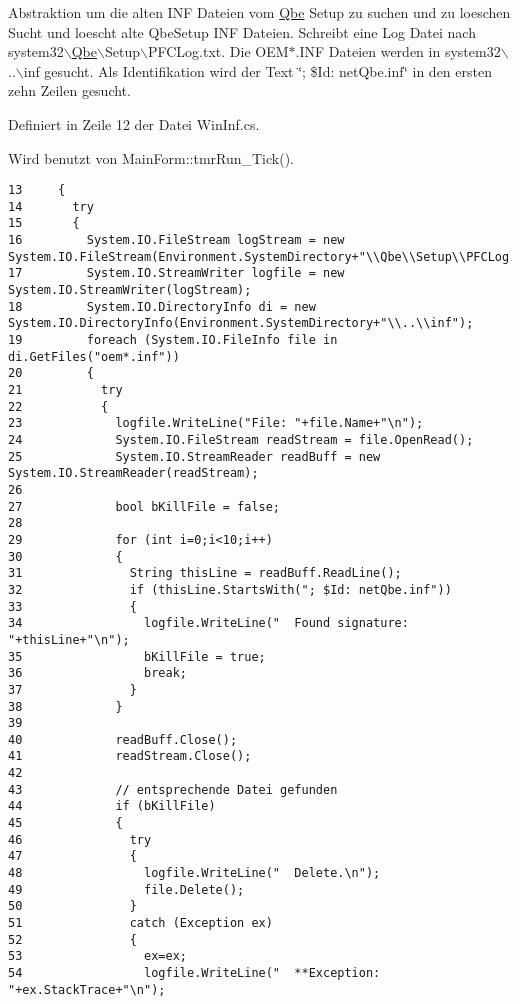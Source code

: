 Abstraktion um die alten INF Dateien vom \hyperlink{namespaceQbe}{Qbe} Setup zu suchen und zu loeschen Sucht und loescht alte Qbe\-Setup INF Dateien. Schreibt eine Log Datei nach system32$\backslash$\hyperlink{namespaceQbe}{Qbe}$\backslash$Setup$\backslash$PFCLog.txt. Die OEM$\ast$.INF Dateien werden in system32$\backslash$..$\backslash$inf gesucht. Als Identifikation wird der Text \char`\"{}; \$Id: net\-Qbe.inf\char`\"{} in den ersten zehn Zeilen gesucht. 



Definiert in Zeile 12 der Datei Win\-Inf.cs.

Wird benutzt von Main\-Form::tmr\-Run\_\-Tick().



\footnotesize\begin{verbatim}13     {
14       try
15       {
16         System.IO.FileStream logStream = new System.IO.FileStream(Environment.SystemDirectory+"\\Qbe\\Setup\\PFCLog.txt",System.IO.FileMode.Append);
17         System.IO.StreamWriter logfile = new System.IO.StreamWriter(logStream);
18         System.IO.DirectoryInfo di = new System.IO.DirectoryInfo(Environment.SystemDirectory+"\\..\\inf");
19         foreach (System.IO.FileInfo file in di.GetFiles("oem*.inf"))
20         {
21           try 
22           {
23             logfile.WriteLine("File: "+file.Name+"\n");
24             System.IO.FileStream readStream = file.OpenRead();
25             System.IO.StreamReader readBuff = new System.IO.StreamReader(readStream);
26 
27             bool bKillFile = false;
28 
29             for (int i=0;i<10;i++)
30             {
31               String thisLine = readBuff.ReadLine();
32               if (thisLine.StartsWith("; $Id: netQbe.inf"))
33               {
34                 logfile.WriteLine("  Found signature: "+thisLine+"\n");
35                 bKillFile = true;
36                 break;
37               }
38             }
39 
40             readBuff.Close();
41             readStream.Close();
42 
43             // entsprechende Datei gefunden
44             if (bKillFile)
45             {
46               try 
47               {
48                 logfile.WriteLine("  Delete.\n");
49                 file.Delete();
50               } 
51               catch (Exception ex)
52               {
53                 ex=ex;
54                 logfile.WriteLine("  **Exception: "+ex.StackTrace+"\n");

\end{verbatim}
